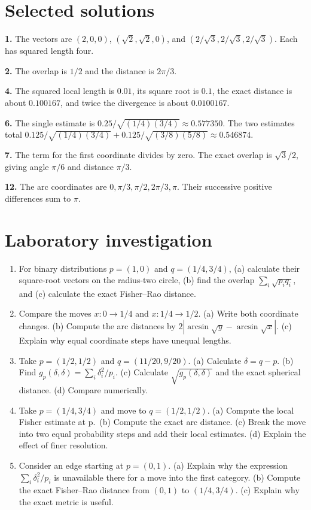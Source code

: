 \documentclass[11pt,oneside,openany]{book}
\theoremstyle{definition}
\theoremstyle{remark}
\numberwithin{equation}{chapter}
\providecommand{\tightlist}{\setlength{\itemsep}{0pt}\setlength{\parskip}{0pt}}
\newcommand{\labheading}{\FloatBarrier\section*{Laboratory investigation}\addcontentsline{toc}{section}{Laboratory investigation}}
\begin{document}
\section{Selected solutions}\label{ch07-selected-solutions}

\textbf{1.} The vectors are \((2,0,0)\), \((\sqrt2,\sqrt2,0)\), and \((2/\sqrt3,2/\sqrt3,2/\sqrt3)\). Each has squared length four.

\textbf{2.} The overlap is \(1/2\) and the distance is \(2\pi/3\).

\textbf{4.} The squared local length is \(0.01\), its square root is \(0.1\), the exact distance is about \(0.100167\), and twice the divergence is about \(0.0100167\).

\textbf{6.} The single estimate is \(0.25/\sqrt{(1/4)(3/4)}\approx0.577350\). The two estimates total \(0.125/\sqrt{(1/4)(3/4)}+0.125/\sqrt{(3/8)(5/8)}\approx0.546874\).

\textbf{7.} The term for the first coordinate divides by zero. The exact overlap is \(\sqrt3/2\), giving angle \(\pi/6\) and distance \(\pi/3\).

\textbf{12.} The arc coordinates are \(0,\pi/3,\pi/2,2\pi/3,\pi\). Their successive positive differences sum to \(\pi\).
\labheading\begin{enumerate}
\def\labelenumi{\arabic{enumi}.}
\tightlist
\item
  For binary distributions \(p=(1,0)\) and \(q=(1/4,3/4)\), (a) calculate their square-root vectors on the radius-two circle, (b) find the overlap \(\sum_i\sqrt{p_iq_i}\), and (c) calculate the exact Fisher--Rao distance.
\item
  Compare the moves \(x:0\to1/4\) and \(x:1/4\to1/2\). (a) Write both coordinate changes. (b) Compute the arc distances by \(2|\arcsin\sqrt y-\arcsin\sqrt x|\). (c) Explain why equal coordinate steps have unequal lengths.
\item
  Take \(p=(1/2,1/2)\) and \(q=(11/20,9/20)\). (a) Calculate \(\delta=q-p\). (b) Find \(g_p(\delta,\delta)=\sum_i\delta_i^2/p_i\). (c) Calculate \(\sqrt{g_p(\delta,\delta)}\) and the exact spherical distance. (d) Compare numerically.
\item
  Take \(p=(1/4,3/4)\) and move to \(q=(1/2,1/2)\). (a) Compute the local Fisher estimate at p.~(b) Compute the exact arc distance. (c) Break the move into two equal probability steps and add their local estimates. (d) Explain the effect of finer resolution.
\item
  Consider an edge starting at \(p=(0,1)\). (a) Explain why the expression \(\sum_i\delta_i^2/p_i\) is unavailable there for a move into the first category. (b) Compute the exact Fisher--Rao distance from \((0,1)\) to \((1/4,3/4)\). (c) Explain why the exact metric is useful.
\end{enumerate}
\end{document}
